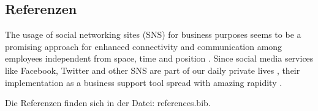 \subsection{Referenzen}
The usage of social networking sites (SNS) for business purposes seems to be a promising approach for enhanced connectivity and communication among employees independent from space, time and position \cite{dimicco2008motivations}. Since social media services like Facebook, Twitter and other SNS are part of our daily private lives \cite{stocker2013exploring}, their implementation as a business support tool spread with amazing rapidity \cite{koch2009enterprise}. 

Die Referenzen finden sich in der Datei: references.bib.




